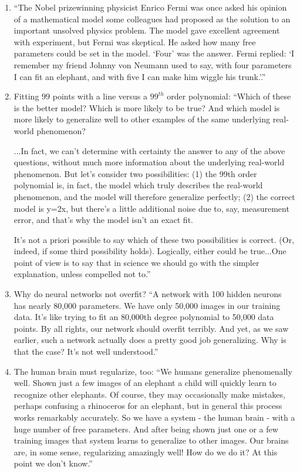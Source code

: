\documentclass[12pt]{article}
\begin{document}
\begin{enumerate}
\item ``The Nobel prizewinning physicist Enrico Fermi was once asked his opinion of a mathematical model some colleagues had proposed as the solution to an important unsolved physics problem. The model gave excellent agreement with experiment, but Fermi was skeptical. He asked how many free parameters could be set in the model. `Four' was the answer. Fermi replied: `I remember my friend Johnny von Neumann used to say, with four parameters I can fit an elephant, and with five I can make him wiggle his trunk.'.''


\item Fitting $99$ points with a line versus a $99^{th}$ order polynomial: ``Which of these is the better model? Which is more likely to be true? And which model is more likely to generalize well to other examples of the same underlying real-world phenomenon?

...In fact, we can't determine with certainty the answer to any of the above questions, without much more information about the underlying real-world phenomenon. But let's consider two possibilities: (1) the 99th order polynomial is, in fact, the model which truly describes the real-world phenomenon, and the model will therefore generalize perfectly; (2) the correct model is y=2x, but there's a little additional noise due to, say, measurement error, and that's why the model isn't an exact fit.

It's not a priori possible to say which of these two possibilities is correct. (Or, indeed, if some third possibility holds). Logically, either could be true...One point of view is to say that in science we should go with the simpler explanation, unless compelled not to.''

\item Why do neural networks not overfit? ``A network with 100 hidden neurons has nearly 80,000 parameters. We have only 50,000 images in our training data. It's like trying to fit an 80,000th degree polynomial to 50,000 data points. By all rights, our network should overfit terribly. And yet, as we saw earlier, such a network actually does a pretty good job generalizing. Why is that the case? It's not well understood.''

\item The human brain must regularize, too: ``We humans generalize phenomenally well. Shown just a few images of an elephant a child will quickly learn to recognize other elephants. Of course, they may occasionally make mistakes, perhaps confusing a rhinoceros for an elephant, but in general this process works remarkably accurately. So we have a system - the human brain - with a huge number of free parameters. And after being shown just one or a few training images that system learns to generalize to other images. Our brains are, in some sense, regularizing amazingly well! How do we do it? At this point we don't know.''

\end{enumerate}
\end{document}
